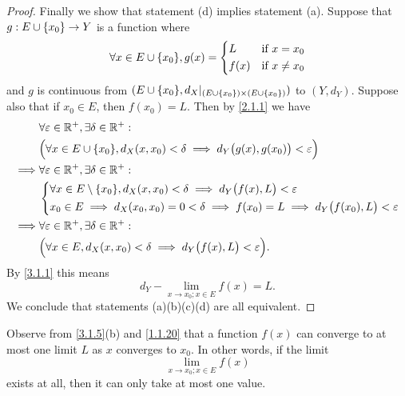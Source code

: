 \begin{proof}
  Finally we show that statement (d) implies statement (a).
  Suppose that \(g : E \cup \left\lbrace x_0\right\rbrace \to Y\) is a function where
  \[
    \forall x \in E \cup \set{x_0}, g(x) = \begin{dcases}
      L    & \text{if } x = x_0    \\
      f(x) & \text{if } x \neq x_0
    \end{dcases}
  \]
  and \(g\) is continuous from \((E \cup \set{x_0}, d_X|_{(E \cup \set{x_0}) \times (E \cup \set{x_0})})\) to \((Y, d_Y)\).
  Suppose also that if \(x_0 \in E\), then \(f(x_0) = L\).
  Then by \cref{2.1.1} we have
  \begin{align*}
             & \forall \varepsilon \in \R^+, \exists \delta \in \R^+ :                                                         \\
             & \Big(\forall x \in E \cup \set{x_0}, d_X(x, x_0) < \delta \implies d_Y\big(g(x), g(x_0)\big) < \varepsilon\Big) \\
    \implies & \forall \varepsilon \in \R^+, \exists \delta \in \R^+ :                                                         \\
             & \begin{dcases}
                 \forall x \in E \setminus \set{x_0}, d_X(x, x_0) < \delta \implies d_Y\big(f(x), L\big) < \varepsilon \\
                 x_0 \in E \implies d_X(x_0, x_0) = 0 < \delta \implies f(x_0) = L \implies d_Y\big(f(x_0), L\big) < \varepsilon
               \end{dcases}  \\
    \implies & \forall \varepsilon \in \R^+, \exists \delta \in \R^+ :                                                         \\
             & \Big(\forall x \in E, d_X(x, x_0) < \delta \implies d_Y\big(f(x), L\big) < \varepsilon\Big).
  \end{align*}
  By \cref{3.1.1} this means
  \[
    d_Y - \lim_{x \to x_0 ; x \in E} f(x) = L.
  \]
  We conclude that statements (a)(b)(c)(d) are all equivalent.
\end{proof}

\begin{rmk}\label{3.1.6}
  Observe from \cref{3.1.5}(b) and \cref{1.1.20} that a function \(f(x)\) can converge to at most one limit \(L\) as \(x\) converges to \(x_0\).
  In other words, if the limit
  \[
    \lim_{x \to x_0 ; x \in E} f(x)
  \]
  exists at all, then it can only take at most one value.
\end{rmk}

